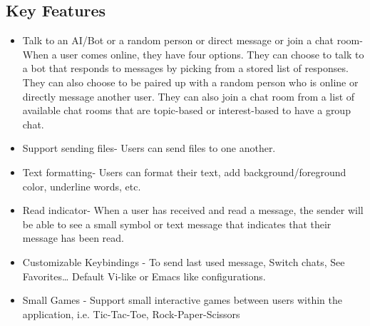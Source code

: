 \documentclass[a4paper]{article}
\begin{document}
    \subsection{Key Features}
    \begin{itemize}
        \item Talk to an AI/Bot or a random person or direct message or join a
            chat room- When a user comes online, they have four options. They
            can choose to talk to a bot that responds to messages by picking
            from a stored list of responses. They can also choose to be paired
            up with a random person who is online or directly message another
            user. They can also join a chat room from a list of available chat
            rooms that are topic-based or interest-based to have a group chat.

        \item Support sending files- Users can send files to one another.

        \item Text formatting- Users can format their
            text, add background/foreground color, underline words, etc.

        \item Read indicator- When a user has received and read a message, the
            sender will be able to see a small symbol or text message that
            indicates that their message has been read.

        \item Customizable Keybindings - To send last used message, Switch
            chats, See Favorites… Default Vi-like or Emacs like configurations.

        \item Small Games - Support small interactive games between users within
            the application, i.e. Tic-Tac-Toe, Rock-Paper-Scissors
    \end{itemize}
\end{document}
